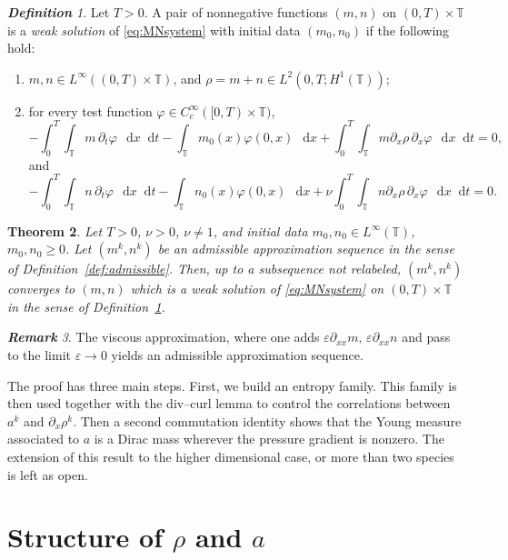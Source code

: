 \documentclass[a4paper,twosided,11pt]{article}
\newcommand{\T}{\mathbb{T}}
\newcommand{\eps}{\varepsilon}
\newcommand{\p}{\partial}
\newcommand{\1}{\mathbf{1}}
\theoremstyle{plain}
\newtheorem{thm}{Theorem}[section]
\theoremstyle{remark}
\newtheorem{remark}[thm]{\bf Remark}
\newtheorem{definition}[thm]{\bf Definition}
\newcommand{\diff}{\mathop{} \mathrm{d}}
\numberwithin{equation}{section}
\begin{document}
\begin{definition}
\label{def:weak-solution}
Let $T>0$. A pair of nonnegative functions $(m,n)$ on $(0,T)\times\T$ is a \emph{weak solution} of \eqref{eq:MNsystem} with initial data $(m_0,n_0)$ if the following hold:
\begin{enumerate}[label=(\roman*)]
\item $m,n\in L^\infty((0,T)\times\T)$, and $\rho=m+n\in L^2(0,T;H^1(\T))$;
\item for every test function $\varphi\in C_c^\infty([0,T)\times\T)$,
\begin{equation}
 -\int_0^T  \int_{\T} m\,\p_t\varphi\,\diff x\diff t
 -\int_{\T}m_0(x)\varphi(0,x)\,\diff x
 +\int_0^T  \int_{\T} m\partial_x\rho\,\p_x\varphi\,\diff x\diff t=0,
\end{equation}
and
\begin{equation}
 -\int_0^T  \int_{\T} n\,\p_t\varphi\,\diff x\diff t
 -\int_{\T}n_0(x)\varphi(0,x)\,\diff x
 +\nu\int_0^T  \int_{\T} n\partial_x\rho\,\p_x\varphi\,\diff x\diff t=0.
\end{equation}
\end{enumerate}
\end{definition}
\begin{thm}
\label{thm:main}
Let $T>0$, $\nu>0$, $\nu\neq 1$, and initial data $m_0,n_0\in L^\infty(\T)$, $m_0,n_0\ge 0$. Let $(m^k,n^k)$ be an admissible approximation sequence in the sense of Definition~\ref{def:admissible}. Then, up to a subsequence not relabeled, $(m^k,n^k)$ converges to $(m,n)$ which is a weak solution of \eqref{eq:MNsystem} on $(0,T)\times\T$ in the sense of Definition~\ref{def:weak-solution}.
\end{thm}


\begin{remark}
The viscous approximation, where one adds $\eps\partial_{xx}m,\,  \eps\partial_{xx}n$ and pass to the limit $\eps\to 0$ yields an admissible approximation sequence.
\end{remark}

The proof has three main steps. First, we build an entropy family. This family is then used together with the div--curl lemma to control the correlations between $a^k$ and $\partial_x\rho^k$. Then a second commutation identity shows that the Young measure associated to $a$ is a Dirac mass wherever the pressure gradient is nonzero. The extension of this result to the higher dimensional case, or more than two species is left as open.


\section{\texorpdfstring{Structure of $\rho$ and $a$}{Structure of rho and a}}
\label{sec:structure}
\end{document}
